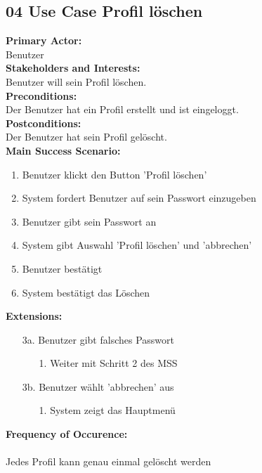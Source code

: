 \documentclass[12pt,a4paper,onecolumn]{article}
\begin{document}
\subsection{04 Use Case Profil löschen}
\textbf{Primary Actor:}\\ Benutzer\\
\textbf{Stakeholders and Interests:}\\
Benutzer will sein Profil löschen.\\
\textbf{Preconditions:} \\ Der Benutzer hat ein Profil erstellt und ist eingeloggt.\\
\textbf{Postconditions:}\\Der Benutzer hat sein Profil gelöscht.\\
\textbf{Main Success Scenario:}
\begin{enumerate}
    \item Benutzer klickt den Button 'Profil löschen'
    \item System fordert Benutzer auf sein Passwort einzugeben
    \item Benutzer gibt sein Passwort an
    \item System gibt Auswahl 'Profil löschen' und 'abbrechen'
    \item Benutzer bestätigt
    \item System bestätigt das Löschen
\end{enumerate}
\textbf{Extensions:}
\begin{enumerate}
    \item [3a.]  Benutzer gibt falsches Passwort
    \begin{enumerate}
        \item[1.]Weiter mit Schritt 2 des MSS
    \end{enumerate}
    \item [3b.]  Benutzer wählt 'abbrechen' aus
    \begin{enumerate}
        \item[1.]System zeigt das Hauptmenü
    \end{enumerate}
\end{enumerate}
\textbf{Frequency of Occurence:}\\ \\
Jedes Profil kann genau einmal gelöscht werden 
\end{document}
